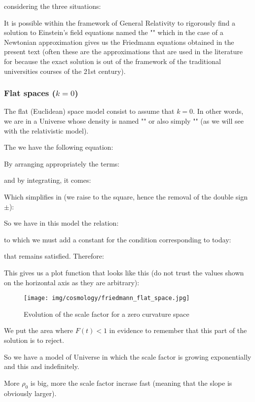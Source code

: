	considering the three situations:
	
	\begin{tcolorbox}[title=Remark,colframe=black,arc=10pt]
	It is possible within the framework of General Relativity to rigorously find a solution to Einstein's field equations named the "" which in the case of a Newtonian approximation gives us the Friedmann equations obtained in the present text (often these are the approximations that are used in the literature for because the exact solution is out of the  framework of the traditional universities courses of the 21st century).
	\end{tcolorbox}
	\subsubsection{Flat spaces ($k=0$)}
	The flat (Euclidean) space model consist to assume that $k=0$. In other words, we are in a Universe whose density is named "" or also simply "" (as we will see with the relativistic model).

	The we have the following equation:
	
	By arranging appropriately the terms:
	
	and by integrating, it comes:
	
	Which simplifies in (we raise to the square, hence the removal of the double sign $\pm$):
	
	So we have in this model the relation:
	
	to which we must add a constant for the condition corresponding to today:
	
	that remains satisfied. Therefore:
	
	This gives us a plot function that looks like this (do not trust the values shown on the horizontal axis as they are arbitrary):
	\begin{figure}[H]
		\begin{center}
		\texttt{[image: img/cosmology/friedmann\_flat\_space.jpg]}
		\end{center}	
		\caption{Evolution of the scale factor for a zero curvature space}
	\end{figure}
	We put the area where $F(t)<1$ in evidence to remember that this part of the solution is to reject.

	So we have a model of Universe in which the scale factor is growing exponentially and this and indefinitely.
	\begin{tcolorbox}[title=Remark,colframe=black,arc=10pt]
	More $\rho_0$ is big, more the scale factor incrase fast (meaning that the slope is obviously larger).
	\end{tcolorbox}
	
